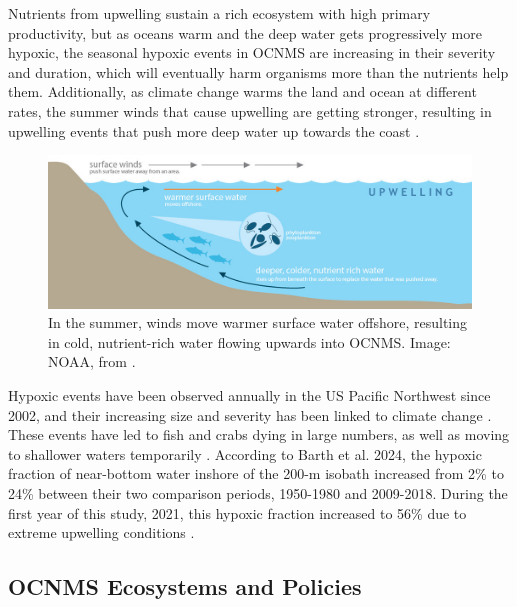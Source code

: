 \documentclass[12pt,twoside]{reedthesis}
\begin{document}
Nutrients from upwelling sustain a rich ecosystem with high primary productivity, but as oceans warm and the deep water gets progressively more hypoxic, the seasonal hypoxic events in OCNMS are increasing in their severity and duration, which will eventually harm organisms more than the nutrients help them. Additionally, as climate change warms the land and ocean at different rates, the summer winds that cause upwelling are getting stronger, resulting in upwelling events that push more deep water up towards the coast \autocite{Barth2024}. 

\begin{figure}[!h]
	\begin{center}
		\includegraphics[scale=0.4]{Fig_NOAA_Upwelling}
		\caption[Upwelling]{\footnotesize{In the summer, winds move warmer surface water offshore, resulting in cold, nutrient-rich water flowing upwards into OCNMS. Image: NOAA, from \autocite{OceanographyOlympicCoast}.}} %
		\label{Upwelling}
	\end{center}
\end{figure} 

Hypoxic events have been observed annually in the US Pacific Northwest since 2002, and their increasing size and severity has been linked to climate change \autocite{Bograd2023, Parks2009}. These events have led to fish and crabs dying in large numbers, as well as moving to shallower waters temporarily \autocite{Grantham2004}. According to Barth et al. 2024, the hypoxic fraction of near-bottom water inshore of the 200-m isobath increased from 2\% to 24\% between their two comparison periods, 1950-1980 and 2009-2018. During the first year of this study, 2021, this hypoxic fraction increased to 56\% due to extreme upwelling conditions \autocite{Barth2024}. 

\subsection{OCNMS Ecosystems and Policies}
\end{document}

